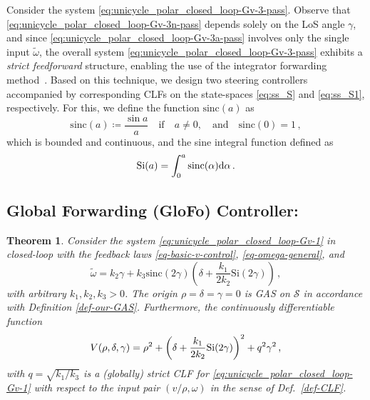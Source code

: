\documentclass[letterpaper, 10 pt, conference]{ieeeconf}  %
\newtheorem{theorem}{Theorem}
\begin{document}
Consider the system \eqref{eq:unicycle_polar_closed_loop-Gv-3-pass}. Observe that \eqref{eq:unicycle_polar_closed_loop-Gv-3n-pass} depends solely on the LoS angle $\gamma$, and since \eqref{eq:unicycle_polar_closed_loop-Gv-3a-pass} involves only the single input $\tilde{\omega}$, the overall system \eqref{eq:unicycle_polar_closed_loop-Gv-3-pass} exhibits a \textit{strict feedforward} structure, enabling the use of the integrator forwarding method~\cite{sepulchre1997forwarding}. Based on this technique, we design two steering controllers accompanied by corresponding CLFs on the state-spaces \eqref{eq:ss_S} and \eqref{eq:ss_S1}, respectively. For this, we define the function $\mbox{sinc}(a)$ as
\begin{equation}
\mbox{sinc}(a) \coloneqq \frac{\sin a}{a} \quad \text{if} \quad a \ne 0, \quad \text{and} \quad \mbox{sinc}(0) = 1 \,,
\end{equation}
which is bounded and continuous, and the sine integral function defined as
\begin{equation}
\mbox{Si}(a) = \int_0^{a}\mbox{sinc}(\alpha){\rm d}\alpha
\,. \label{eq:Si_function}
\end{equation}

\subsection{Global Forwarding (GloFo) Controller:}

\begin{theorem}
\label{thm:CLF_GloFo}
Consider the system \eqref{eq:unicycle_polar_closed_loop-Gv-1} in closed-loop with the feedback laws \eqref{eq-basic-v-control}, \eqref{eq-omega-general}, and
\begin{equation}
\label{eq:GloFo}
\tilde\omega = k_2\gamma + k_3\mbox{sinc}(2\gamma)
\left(\delta + \dfrac{k_1}{2k_2}\mbox{Si}(2\gamma) \right) \,,
\end{equation}
 with arbitrary $k_1, k_2, k_3 > 0$.
The origin $\rho = \delta = \gamma = 0$ is GAS on $\mathcal{S}$ in accordance with Definition \ref{def-our-GAS}.
Furthermore, the
continuously differentiable function 
\begin{equation}
V(\rho,\delta, \gamma)  = 
\rho^2+\left(\delta + \frac{k_1}{2k_2} {\rm Si}(2\gamma) \right)^2 + q^2 \gamma^2
\,,  \label{eq:V_CLF_GloFo_gamma_delta}
\end{equation}
with $q = \sqrt{k_1/k_3}$ is a (globally) strict CLF for \eqref{eq:unicycle_polar_closed_loop-Gv-1} with respect to the input pair $(v/\rho,\omega)$ in the sense of Def.~\ref{def-CLF}. 
\end{theorem}
\end{document}
